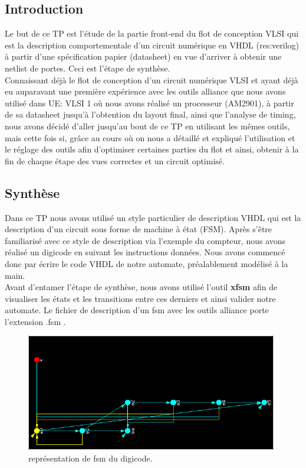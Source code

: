 \documentclass[12pt]{article}
\begin{document}
\subsection{Introduction}
Le but de ce TP est l'étude de la partie front-end du flot de conception VLSI qui est la description comportementale d'un circuit numérique en VHDL (res:verilog) à partir d'une spécification papier (datasheet) en vue d'arriver à obtenir une netlist de portes. 
Ceci est l'étape de synthèse.\\
Connaissant déjà le flot de conception d'un circuit numérique VLSI et ayant déjà eu auparavant une première expérience avec les outils alliance que nous avons utilisé dans UE: VLSI 1 où nous avons réalisé un processeur (AM2901), à partir de sa datasheet jusqu'à l'obtention du layout final, ainsi que l'analyse de timing, nous avons décidé d'aller jusqu'au bout de ce TP en utilisant les mêmes outils, mais cette fois si, grâce au cours où on  nous a détaillé et  expliqué l'utilisation et le réglage des outils afin d'optimiser certaines parties du flot et ainsi, obtenir à la fin de chaque étape des vues correctes et un circuit optimisé.\\

\subsection{Synthèse}
Dans ce TP nous avons utilisé un style particulier de description VHDL qui est la description d'un circuit sous forme de machine à état (FSM). Après s'être familiarisé avec ce style de description via l'exemple du compteur, nous avons réalisé un digicode en suivant les instructions données. Nous avons commencé donc par écrire le code VHDL de notre automate, préalablement modélisé à la main.\\

Avant d'entamer l'étape de synthèse, nous avons utilisé l'outil \textbf{xfsm} afin de visualiser les états et les transitions entre ces derniers et ainsi valider notre automate. Le fichier de description d'un fsm avec les outils alliance porte l'extension .fsm .\\
\begin{figure}
\begin{center}
  \includegraphics[width = 11cm]{pic/fsm.png}
\end{center}
\caption{représentation de fsm du digicode.}
\end{figure}
\end{document}
